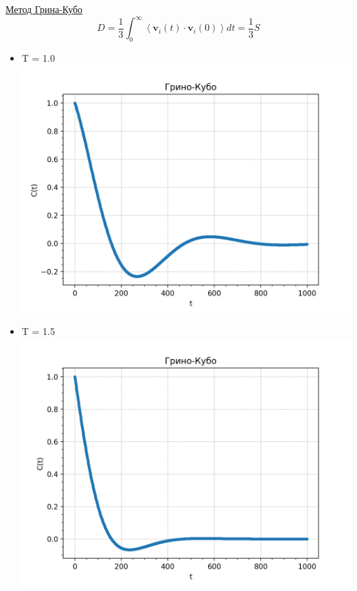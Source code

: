 \begin{minipage}{0.45\textwidth}
    \begin{center}
    \underline{Метод Грина-Кубо}
    $$D=\frac{1}{3} \int_{0}^{\infty}\left\langle\mathbf{v}_{i}(t) \cdot \mathbf{v}_{i}(0)\right\rangle d t = \frac13S$$
    \begin{itemize}
    \item T = 1.0\\
    
    \includegraphics[width=\linewidth]{d.png}\\
    
    \item T = 1.5\\
    
    \includegraphics[width=\linewidth]{e.png}\\
    

\end{itemize}
\end{center}
\end{minipage}
